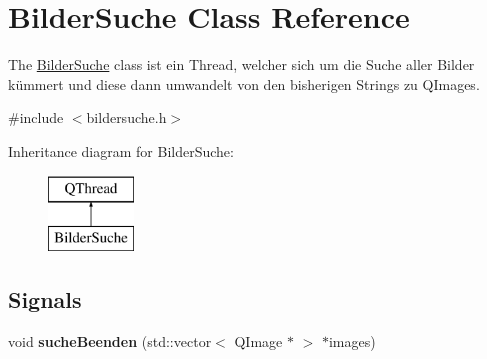 \hypertarget{class_bilder_suche}{}\section{Bilder\+Suche Class Reference}
\label{class_bilder_suche}


The \hyperlink{class_bilder_suche}{Bilder\+Suche} class ist ein Thread, welcher sich um die Suche aller Bilder kümmert und diese dann umwandelt von den bisherigen Strings zu Q\+Images.  




{\ttfamily \#include $<$bildersuche.\+h$>$}

Inheritance diagram for Bilder\+Suche\+:\begin{figure}[H]
\begin{center}
\leavevmode
\includegraphics[height=2.000000cm]{class_bilder_suche}
\end{center}
\end{figure}
\subsection*{Signals}
\begin{DoxyCompactItemize}
\item 
void {\bfseries suche\+Beenden} (std\+::vector$<$ Q\+Image $\ast$ $>$ $\ast$images)\hypertarget{class_bilder_suche_a3fed6bc7ae0c8760b7a1f28e3983044e}{}\label{class_bilder_suche_a3fed6bc7ae0c8760b7a1f28e3983044e}

\end{DoxyCompactItemize}
